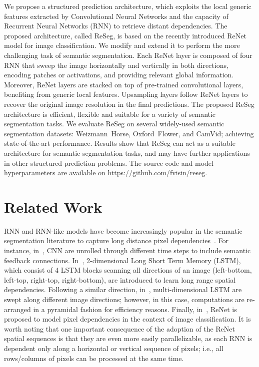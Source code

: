 We propose a structured prediction architecture, which exploits the local
generic features extracted by Convolutional Neural Networks and the capacity of
Recurrent Neural Networks (RNN) to retrieve distant dependencies. The proposed
architecture, called ReSeg, is based on the recently introduced ReNet model for
image classification. We modify and extend it to perform the more challenging
task of semantic segmentation. Each ReNet layer is composed of four RNN that
sweep the image horizontally and vertically in both directions, encoding
patches or activations, and providing relevant global information. Moreover,
ReNet layers are stacked on top of pre-trained convolutional layers, benefiting
from generic local features. Upsampling layers follow ReNet layers to recover
the original image resolution in the final predictions. The proposed ReSeg
architecture is efficient, flexible and suitable for a variety of semantic
segmentation tasks. We evaluate ReSeg on several widely-used semantic
segmentation datasets: Weizmann~Horse, Oxford~Flower, and CamVid; achieving
state-of-the-art performance. Results show that ReSeg can act as a suitable
architecture for semantic segmentation tasks, and may have further applications
in other structured prediction problems. The source code and model
hyperparameters are available on
\href{https://github.com/fvisin/reseg}{https://github.com/fvisin/reseg}.


\section{Related Work}

RNN and RNN-like models have become increasingly popular in the semantic
segmentation literature to capture long distance pixel
dependencies~\cite{Pinheiro:2014, Gatta14-deepvision,
byeon2015scene,stollenga2015parallel}. For instance, in~\cite{Pinheiro:2014,
Gatta14-deepvision}, CNN are unrolled through different time steps to include
semantic feedback connections. In~\cite{byeon2015scene}, 2-dimensional Long
Short Term Memory (LSTM), which consist of 4 LSTM blocks
scanning all directions of an image (left-bottom, left-top, right-top, right-bottom),
are introduced to learn long range spatial dependencies. Following a similar direction,
in~\cite{stollenga2015parallel}, multi-dimensional LSTM are swept along
different image directions; however, in this case, computations are re-arranged
in a pyramidal fashion for efficiency reasons. Finally,
in~\cite{visin2015renet}, ReNet is proposed to model pixel dependencies in the
context of image classification. It is worth noting that one important
consequence of the adoption of the ReNet spatial sequences is that they are
even more easily parallelizable, as each RNN is dependent only along a horizontal or
vertical sequence of pixels; i.e., all rows/columns of pixels can be processed
at the same time.

